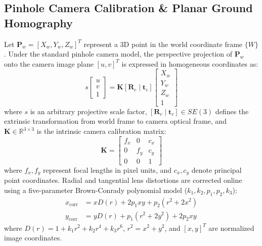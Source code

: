 \documentclass[journal]{IEEEtran}
\begin{document}
\subsection{Pinhole Camera Calibration \& Planar Ground Homography}
Let $\mathbf{P}_w = [X_w, Y_w, Z_w]^T$ represent a 3D point in the world coordinate frame $\{W\}$. Under the standard pinhole camera model, the perspective projection of $\mathbf{P}_w$ onto the camera image plane $[u, v]^T$ is expressed in homogeneous coordinates as:
\begin{equation}
s \begin{bmatrix} u \\ v \\ 1 \end{bmatrix} = \mathbf{K} \left[ \mathbf{R}_{c} \mid \mathbf{t}_{c} \right] \begin{bmatrix} X_w \\ Y_w \\ Z_w \\ 1 \end{bmatrix}
\end{equation}
where $s$ is an arbitrary projective scale factor, $[\mathbf{R}_c \mid \mathbf{t}_c] \in SE(3)$ defines the extrinsic transformation from world frame to camera optical frame, and $\mathbf{K} \in \mathbb{R}^{3\times3}$ is the intrinsic camera calibration matrix:
\begin{equation}
\mathbf{K} = \begin{bmatrix}
f_x & 0 & c_x \\
0 & f_y & c_y \\
0 & 0 & 1
\end{bmatrix}
\end{equation}
where $f_x, f_y$ represent focal lengths in pixel units, and $c_x, c_y$ denote principal point coordinates. Radial and tangential lens distortions are corrected online using a five-parameter Brown-Conrady polynomial model ($k_1, k_2, p_1, p_2, k_3$):
\begin{align}
x_{\text{corr}} &= x D(r) + 2 p_1 x y + p_2 (r^2 + 2 x^2) \\
y_{\text{corr}} &= y D(r) + p_1 (r^2 + 2 y^2) + 2 p_2 x y
\end{align}
where $D(r) = 1 + k_1 r^2 + k_2 r^4 + k_3 r^6$, $r^2 = x^2 + y^2$, and $[x, y]^T$ are normalized image coordinates.
\end{document}
